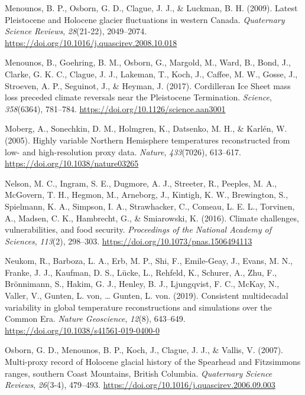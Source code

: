 \documentclass[
  letterpaper,
  DIV=11,
  numbers=noendperiod]{scrartcl}
\newlength{\cslhangindent}
\newlength{\cslentryspacingunit} %
\newenvironment{CSLReferences}[2] %
 {%
  \setlength{\parindent}{0pt}
  \ifodd #1
  \let\oldpar\par
  \def\par{\hangindent=\cslhangindent\oldpar}
  \fi
  \setlength{\parskip}{#2\cslentryspacingunit}
 }%
 {}
\begin{document}
\begin{CSLReferences}{1}{0}
\leavevmode{}%
Menounos, B. P., Osborn, G. D., Clague, J. J., \& Luckman, B. H. (2009).
{Latest Pleistocene and Holocene glacier fluctuations in western
Canada}. \emph{Quaternary Science Reviews}, \emph{28}(21-22),
2049--2074. \url{https://doi.org/10.1016/j.quascirev.2008.10.018}

\leavevmode{}%
Menounos, B., Goehring, B. M., Osborn, G., Margold, M., Ward, B., Bond,
J., Clarke, G. K. C., Clague, J. J., Lakeman, T., Koch, J., Caffee, M.
W., Gosse, J., Stroeven, A. P., Seguinot, J., \& Heyman, J. (2017).
{Cordilleran Ice Sheet mass loss preceded climate reversals near the
Pleistocene Termination}. \emph{Science}, \emph{358}(6364), 781--784.
\url{https://doi.org/10.1126/science.aan3001}

\leavevmode{}%
Moberg, A., Sonechkin, D. M., Holmgren, K., Datsenko, M. H., \& Karlén,
W. (2005). {Highly variable Northern Hemisphere temperatures
reconstructed from low- and high-resolution proxy data}. \emph{Nature},
\emph{433}(7026), 613--617. \url{https://doi.org/10.1038/nature03265}

\leavevmode{}%
Nelson, M. C., Ingram, S. E., Dugmore, A. J., Streeter, R., Peeples, M.
A., McGovern, T. H., Hegmon, M., Arneborg, J., Kintigh, K. W.,
Brewington, S., Spielmann, K. A., Simpson, I. A., Strawhacker, C.,
Comeau, L. E. L., Torvinen, A., Madsen, C. K., Hambrecht, G., \&
Smiarowski, K. (2016). {Climate challenges, vulnerabilities, and food
security}. \emph{Proceedings of the National Academy of Sciences},
\emph{113}(2), 298--303. \url{https://doi.org/10.1073/pnas.1506494113}

\leavevmode{}%
Neukom, R., Barboza, L. A., Erb, M. P., Shi, F., Emile-Geay, J., Evans,
M. N., Franke, J. J., Kaufman, D. S., Lücke, L., Rehfeld, K., Schurer,
A., Zhu, F., Brönnimann, S., Hakim, G. J., Henley, B. J., Ljungqvist, F.
C., McKay, N., Valler, V., Gunten, L. von, \ldots{} Gunten, L. von.
(2019). {Consistent multidecadal variability in global temperature
reconstructions and simulations over the Common Era}. \emph{Nature
Geoscience}, \emph{12}(8), 643--649.
\url{https://doi.org/10.1038/s41561-019-0400-0}

\leavevmode{}%
Osborn, G. D., Menounos, B. P., Koch, J., Clague, J. J., \& Vallis, V.
(2007). {Multi-proxy record of Holocene glacial history of the Spearhead
and Fitzsimmons ranges, southern Coast Mountains, British Columbia}.
\emph{Quaternary Science Reviews}, \emph{26}(3-4), 479--493.
\url{https://doi.org/10.1016/j.quascirev.2006.09.003}


\end{CSLReferences}
\end{document}
